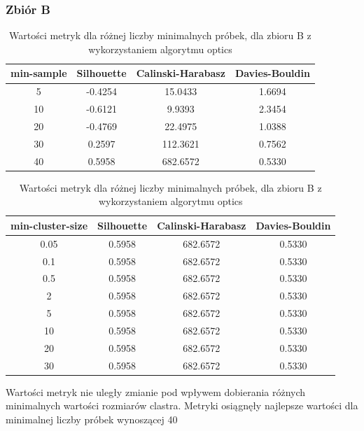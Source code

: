\documentclass[a4paper,11pt]{article}
\begin{document}
\subsubsection*{Zbiór B}
\begin{table}[H]
    \centering
    \begin{tabular}{|c|c|c|c|}
    \hline
    \textbf{min-sample} & \textbf{Silhouette} & \textbf{Calinski-Harabasz} & \textbf{Davies-Bouldin} \\ \hline
    5   & -0.4254 & 15.0433 & 1.6694 \\ \hline
    10  & -0.6121 & 9.9393 & 2.3454 \\ \hline
    20  & -0.4769 & 22.4975 & 1.0388 \\ \hline
    30  & 0.2597 & 112.3621 & 0.7562 \\ \hline
    40 & 0.5958 & 682.6572 & 0.5330 \\ \hline
    \end{tabular}
    \caption{Wartości metryk dla różnej liczby minimalnych próbek, dla zbioru B z wykorzystaniem algorytmu optics}
    \label{tab:op_b_1}
\end{table}
\begin{table}[H]
    \centering
    \begin{tabular}{|c|c|c|c|}
    \hline
    \textbf{min-cluster-size} & \textbf{Silhouette} & \textbf{Calinski-Harabasz} & \textbf{Davies-Bouldin} \\ \hline
    0.05   & 0.5958 & 682.6572 & 0.5330 \\ \hline
    0.1  & 0.5958 & 682.6572 & 0.5330 \\ \hline
    0.5  & 0.5958 & 682.6572 & 0.5330 \\ \hline
    2  & 0.5958 & 682.6572 & 0.5330 \\ \hline
    5  & 0.5958 & 682.6572 & 0.5330 \\ \hline
    10  & 0.5958 & 682.6572 & 0.5330 \\ \hline
    20  & 0.5958 & 682.6572 & 0.5330 \\ \hline
    30  & 0.5958 & 682.6572 & 0.5330 \\ \hline
    \end{tabular}
    \caption{Wartości metryk dla różnej liczby minimalnych próbek, dla zbioru B z wykorzystaniem algorytmu optics}
    \label{tab:op_b_2}
\end{table}
Wartości metryk nie uległy zmianie pod wpływem dobierania różnych minimalnych wartości rozmiarów clastra. Metryki osiągnęły najlepsze wartości dla minimalnej liczby próbek wynoszącej 40
\end{document}
